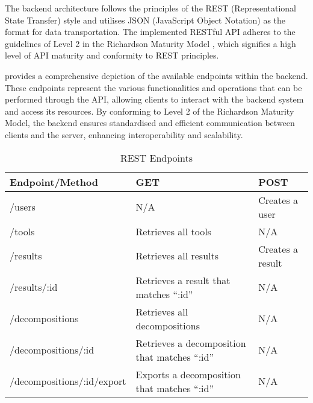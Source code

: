 The backend architecture follows the principles of the REST (Representational
State Transfer) style and utilises JSON (JavaScript Object Notation) as the
format for data transportation. The implemented RESTful API adheres to the
guidelines of Level 2 in the Richardson Maturity Model
\cite{fowler-richardson-maturity-model}, which signifies a high level of API
maturity and conformity to REST principles.

 provides a comprehensive depiction of the available
endpoints within the backend. These endpoints represent the various
functionalities and operations that can be performed through the API, allowing
clients to interact with the backend system and access its resources. By
conforming to Level 2 of the Richardson Maturity Model, the backend ensures
standardised and efficient communication between clients and the server,
enhancing interoperability and scalability.

\begin{table}[!htb] \caption{REST Endpoints} \label{tab:rest_endpoints}
  \begin{center}
    \begin{tabular}[c]{p{12em}|p{12em}|p{12em}}
      \textbf{Endpoint/Method} &
      \textbf{GET} &
      \textbf{POST} \\
      \hline {/users} & N/A & Creates a user \\
      \hline {/tools} & Retrieves all tools & N/A \\
      \hline {/results} & Retrieves all results & Creates a result \\
      \hline {/results/:id} & Retrieves a result that matches ``:id'' & N/A \\
      \hline {/decompositions} & Retrieves all decompositions & N/A \\
      \hline {/decompositions/:id} & Retrieves a decomposition that matches ``:id'' & N/A \\
      \hline {/decompositions/:id/export} & Exports a decomposition that matches ``:id'' & N/A \\
    \end{tabular}
  \end{center}
\end{table}
